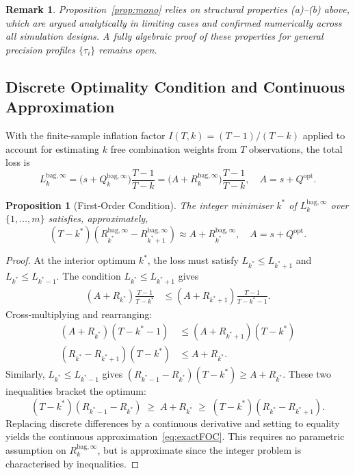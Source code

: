 \documentclass[12pt,a4paper]{article}
\newtheorem{proposition}{Proposition}
\newtheorem{remark}{Remark}
\theoremstyle{definition}
\newcommand{\Qopt}{Q^{\mathrm{opt}}}
\newcommand{\Qbag}{Q_k^{\mathrm{bag},\infty}}
\newcommand{\Rk}{R_k^{\mathrm{bag},\infty}}
\begin{document}
\begin{remark}
Proposition~\ref{prop:mono} relies on structural properties (a)--(b) above,
which are argued analytically in limiting cases and confirmed numerically
across all simulation designs.  A fully algebraic proof of these properties
for general precision profiles $\{\tau_i\}$ remains open.
\end{remark}

\subsection{Discrete Optimality Condition and Continuous Approximation}

With the finite-sample inflation factor $I(T,k)=(T-1)/(T-k)$ applied to
account for estimating $k$ free combination weights from $T$ observations,
the total loss is
\begin{equation}\label{eq:Ltotal}
  L_k^{\mathrm{bag},\infty} = \bigl(s+\Qbag\bigr)\frac{T-1}{T-k}
  = \bigl(A + \Rk\bigr)\frac{T-1}{T-k},\quad A=s+\Qopt.
\end{equation}

\begin{proposition}[First-Order Condition]\label{prop:foc}
The integer minimiser $k^*$ of $L_k^{\mathrm{bag},\infty}$ over
$\{1,\ldots,m\}$ satisfies, approximately,
\begin{equation}\label{eq:exactFOC}
  (T-k^*)\!\left(R_{k^*}^{\mathrm{bag},\infty}-R_{k^*+1}^{\mathrm{bag},\infty}\right)
  \approx A + R_{k^*}^{\mathrm{bag},\infty}, \quad A = s + \Qopt.
\end{equation}
\end{proposition}

\begin{proof}
At the interior optimum $k^*$, the loss must satisfy
$L_{k^*}\le L_{k^*+1}$ and $L_{k^*}\le L_{k^*-1}$.  The condition
$L_{k^*}\le L_{k^*+1}$ gives
\begin{align*}
(A+R_{k^*})\frac{T-1}{T-k^*} &\le (A+R_{k^*+1})\frac{T-1}{T-k^*-1}.
\end{align*}
Cross-multiplying and rearranging:
\begin{align*}
(A+R_{k^*})(T-k^*-1) &\le (A+R_{k^*+1})(T-k^*)\\
(R_{k^*}-R_{k^*+1})(T-k^*) &\le A+R_{k^*}.
\end{align*}
Similarly, $L_{k^*}\le L_{k^*-1}$ gives
$(R_{k^*-1}-R_{k^*})(T-k^*)\ge A+R_{k^*}$.
These two inequalities bracket the optimum:
\begin{equation*}
  (T-k^*)(R_{k^*-1}-R_{k^*}) \;\ge\; A+R_{k^*} \;\ge\; (T-k^*)(R_{k^*}-R_{k^*+1}).
\end{equation*}
Replacing discrete differences by a continuous derivative and setting to
equality yields the continuous approximation~\eqref{eq:exactFOC}.  This
requires no parametric assumption on $R_k^{\mathrm{bag},\infty}$, but is
approximate since the integer problem is characterised by inequalities.
\end{proof}
\end{document}
